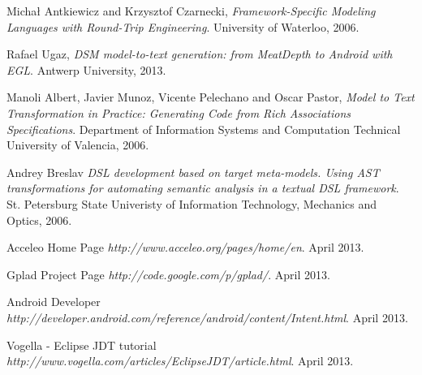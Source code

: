 \begin{thebibliography}{9}

  Michał Antkiewicz and Krzysztof Czarnecki,
  \emph{Framework-Specific Modeling Languages with Round-Trip Engineering}.
  University of Waterloo,
  2006.
  
  Rafael Ugaz,
  \emph{DSM model-to-text generation: from MeatDepth to Android with EGL}.
  Antwerp University,
  2013.
 
  Manoli Albert, Javier Munoz, Vicente Pelechano and Oscar Pastor,
  \emph{Model to Text Transformation in Practice: Generating Code from Rich Associations Specifications}.
  Department of Information Systems and Computation Technical University of Valencia,
  2006.  
  
  Andrey Breslav
  \emph{DSL development based on target meta-models. Using AST transformations for automating semantic analysis in a textual DSL framework}.
  St. Petersburg State Univeristy of Information Technology, Mechanics and Optics,
  2006. 

  Acceleo Home Page
  \emph{http://www.acceleo.org/pages/home/en}.
  April 2013. 
  
  Gplad Project Page
  \emph{http://code.google.com/p/gplad/}.
  April 2013. 

  Android Developer
  \emph{http://developer.android.com/reference/android/content/Intent.html}.
  April 2013. 
  
  Vogella - Eclipse JDT tutorial
  \emph{http://www.vogella.com/articles/EclipseJDT/article.html}.
  April 2013. 
     
\end{thebibliography}